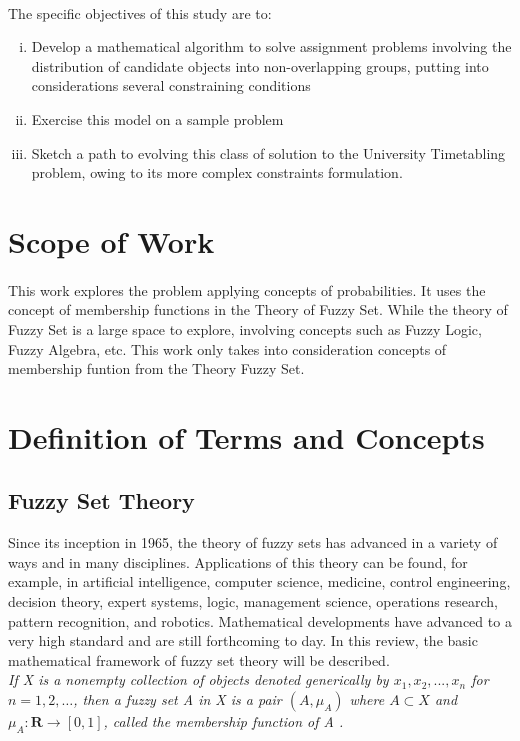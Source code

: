 \documentclass[a4paper,openany]{book}
\begin{document}
            \paragraph{}
                The specific objectives of this study are to:
                \begin{enumerate}[(i)]
                    \item Develop a mathematical algorithm to solve assignment problems involving the distribution of candidate objects into non-overlapping groups, putting into considerations several constraining conditions
                    \item Exercise this model on a sample problem
                    \item Sketch a path to evolving this class of solution to the University Timetabling problem, owing to its more complex constraints formulation.
				\end{enumerate}        
		\section{Scope of Work}
			\paragraph{}
			This work explores the problem applying concepts of probabilities. It uses the concept of membership functions in the Theory of Fuzzy Set. While the theory of Fuzzy Set is a large space to explore, involving concepts such as Fuzzy Logic, Fuzzy Algebra, etc. This work only takes into consideration concepts of membership funtion from the Theory Fuzzy Set.
		\section{Definition of Terms and Concepts}
			\subsection{Fuzzy Set Theory}
				Since its inception in 1965, the theory of fuzzy sets has advanced in a variety of ways and in many disciplines. Applications of this theory can be found, for example, in artificial intelligence, computer science, medicine, control engineering, decision theory, expert systems, logic, management science, operations research, pattern recognition, and robotics. 
				Mathematical developments have advanced to a very high standard and are still forthcoming to day. In this review, the basic mathematical framework of fuzzy set theory will be described.
				\\\textit{
						If X is a nonempty collection of objects denoted generically by $x_1, x_2, ..., x_n$ for $n = 1,2,\dots$, then a fuzzy set A in X is a pair $(A,\mu_A)$ where $A \subset X $ and $\mu_A \colon \textbf{R} \to [0,1]$, called the \emph{membership function of A} \cite{fuz}.
				}
\end{document}
